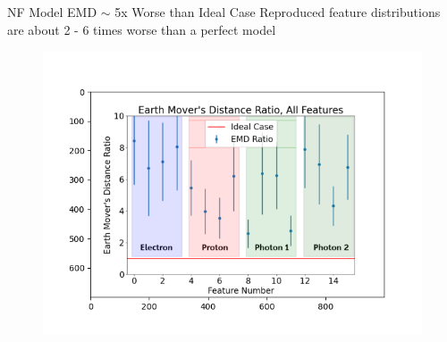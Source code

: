 \documentclass[aspectratio=169]{beamer}
\begin{document}
\begin{frame}{NF Model EMD $\sim$ 5x Worse than Ideal Case}
Reproduced feature distributions are about 2 - 6 times worse than a perfect model
\begin{figure}[!h]
    \centering
    \includegraphics[width=.6\textwidth,trim={2.5cm 1.75cm 2cm 2.1cm},clip]{images/EMD/nflow_emd_with_text.png}
    \label{fig:EMD}
\end{figure}
\end{frame}
\end{document}
